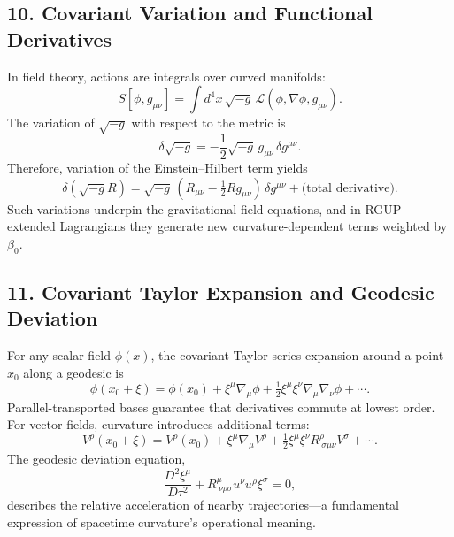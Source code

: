 \documentclass[11pt,oneside]{book}
\numberwithin{equation}{chapter}
\newcommand{\betaz}{\beta_0}
\begin{document}
\subsection*{10. Covariant Variation and Functional Derivatives}

In field theory, actions are integrals over curved manifolds:
\begin{equation}
S[\phi,g_{\mu\nu}]
= \int d^4x\,\sqrt{-g}\,\mathcal{L}(\phi,\nabla\phi,g_{\mu\nu}).
\end{equation}
The variation of $\sqrt{-g}$ with respect to the metric is
\begin{equation}
\delta \sqrt{-g} = -\frac{1}{2}\sqrt{-g}\,g_{\mu\nu}\,\delta g^{\mu\nu}.
\end{equation}
Therefore, variation of the Einstein–Hilbert term yields
\begin{equation}
\delta(\sqrt{-g}R)
= \sqrt{-g}\,(R_{\mu\nu}-\tfrac{1}{2}R g_{\mu\nu})\,\delta g^{\mu\nu}
+ \text{(total derivative)}.
\end{equation}
Such variations underpin the gravitational field equations, and in RGUP-extended Lagrangians they generate new curvature-dependent terms weighted by $\betaz$.

\subsection*{11. Covariant Taylor Expansion and Geodesic Deviation}

For any scalar field $\phi(x)$, the covariant Taylor series expansion around a point $x_0$ along a geodesic is
\begin{equation}
\phi(x_0+\xi)
= \phi(x_0)
+ \xi^\mu\nabla_\mu\phi
+ \tfrac{1}{2}\xi^\mu\xi^\nu\nabla_\mu\nabla_\nu\phi
+ \cdots.
\end{equation}
Parallel-transported bases guarantee that derivatives commute at lowest order.  
For vector fields, curvature introduces additional terms:
\begin{equation}
V^\rho(x_0+\xi)
= V^\rho(x_0)
+ \xi^\mu\nabla_\mu V^\rho
+ \tfrac{1}{2}\xi^\mu\xi^\nu
R^\rho_{\ \sigma\mu\nu}V^\sigma
+ \cdots.
\end{equation}
The geodesic deviation equation,
\begin{equation}
\frac{D^2 \xi^\mu}{D\tau^2}
+ R^\mu_{\ \nu\rho\sigma}u^\nu u^\rho \xi^\sigma = 0,
\end{equation}
describes the relative acceleration of nearby trajectories—a fundamental expression of spacetime curvature’s operational meaning.
\end{document}
